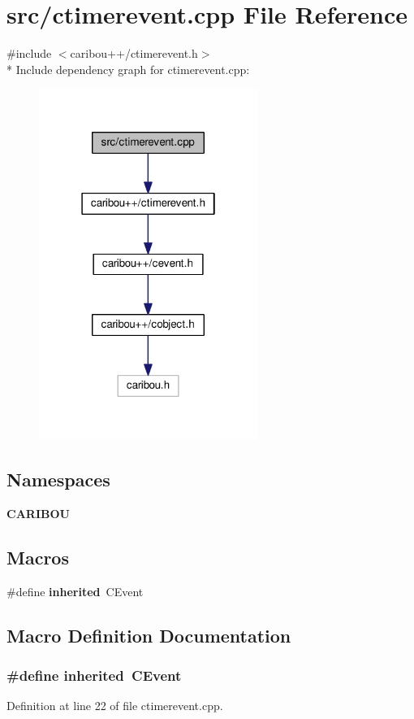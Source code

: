 \section{src/ctimerevent.cpp File Reference}
\label{ctimerevent_8cpp}
{\ttfamily \#include $<$caribou++/ctimerevent.\-h$>$}\\*
Include dependency graph for ctimerevent.\-cpp\-:\nopagebreak
\begin{figure}[H]
\begin{center}
\leavevmode
\includegraphics[width=202pt]{ctimerevent_8cpp__incl}
\end{center}
\end{figure}
\subsection*{Namespaces}
\begin{DoxyCompactItemize}
\item 
{\bf C\-A\-R\-I\-B\-O\-U}
\end{DoxyCompactItemize}
\subsection*{Macros}
\begin{DoxyCompactItemize}
\item 
\#define {\bf inherited}~C\-Event
\end{DoxyCompactItemize}


\subsection{Macro Definition Documentation}
\subsubsection[{inherited}]{\setlength{\rightskip}{0pt plus 5cm}\#define inherited~C\-Event}\label{ctimerevent_8cpp_a3920e3b7cb0909b941b2409493acf8f1}


Definition at line 22 of file ctimerevent.\-cpp.

